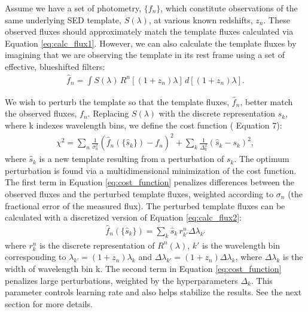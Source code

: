Assume we have a set of photometry, $\{f_n\}$, which constitute observations of the same underlying SED template, $S(\lambda)$, at various known redshifts, $z_n$. 
These observed fluxes should approximately match the template fluxes calculated via Equation \ref{eq:calc_flux1}. 
However, we can also calculate the template fluxes by imagining that we are observing the template in its rest frame using a set of effective, blueshifted filters:
\begin{align}
    \hat{f}_n = \int S(\lambda) \, R^n[(1+z_n)\lambda] \, d[(1+z_n)\lambda]. \label{eq:calc_flux2}
\end{align}

We wish to perturb the template so that the template fluxes, $\hat{f}_n$, better match the observed fluxes, $f_n$. 
Replacing $S(\lambda)$ with the discrete representation $s_k$, where k indexes wavelength bins, we define the cost function (\citealt{Budavari2000b} Equation 7):
\begin{align}
    \chi^2 =
    \sum_n \frac{1}{\sigma_n^2}(\hat{f}_n(\{\hat{s}_k\}) - f_n)^2 + 
    \sum_k \frac{1}{\Delta_k^2}(\hat{s}_k - s_k)^2, \label{eq:cost_function}
\end{align}
where $\hat{s}_k$ is a new template resulting from a perturbation of $s_k$.
The optimum perturbation is found via a multidimensional minimization of the cost function. 
The first term in Equation \ref{eq:cost_function} penalizes differences between the observed fluxes and the perturbed template fluxes, weighted according to $\sigma_n$ (the fractional error of the measured flux). 
The perturbed template fluxes can be calculated with a discretized version of Equation \ref{eq:calc_flux2}:
\begin{align}
    \hat{f}_n(\{\hat{s}_k\}) = \sum_k \hat{s}_k \, r_{k'}^n \Delta\lambda_{k'}
\end{align}
where $r_k^n$ is the discrete representation of $R^n(\lambda)$, $k'$ is the wavelength bin corresponding to $\lambda_{k'} = (1+z_n) \lambda_k$ and $\Delta\lambda_{k'} = (1+z_n)\Delta\lambda_k$, where $\Delta\lambda_k$ is the width of wavelength bin k. 
The second term in Equation \ref{eq:cost_function} penalizes large perturbations, weighted by the hyperparameters $\Delta_k$. 
This parameter controls learning rate and also helps stabilize the results. 
See the next section for more details. 

